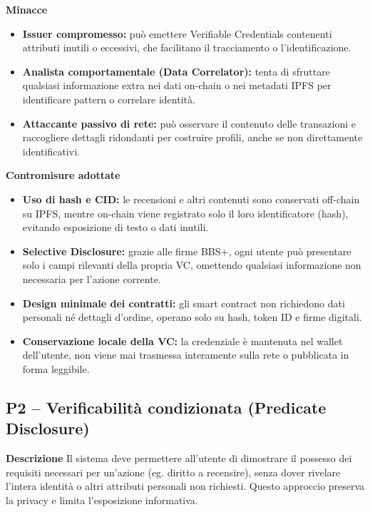             \noindent \textbf{Minacce}
                \begin{itemize}
                    \item \textbf{Issuer compromesso:} può emettere Verifiable Credentials contenenti attributi inutili o eccessivi, che facilitano il tracciamento o l'identificazione.

                    \item \textbf{Analista comportamentale (Data Correlator):} tenta di sfruttare qualsiasi informazione extra nei dati on-chain o nei metadati IPFS per identificare pattern o correlare identità.

                    \item \textbf{Attaccante passivo di rete:} può osservare il contenuto delle transazioni e raccogliere dettagli ridondanti per costruire profili, anche se non direttamente identificativi.
                \end{itemize}

            \noindent \textbf{Contromisure adottate}
                \begin{itemize}
                    \item \textbf{Uso di hash e CID:} le recensioni e altri contenuti sono conservati off-chain su IPFS, mentre on-chain viene registrato solo il loro identificatore (hash), evitando esposizione di testo o dati inutili.

                    \item \textbf{Selective Disclosure:} grazie alle firme BBS+, ogni utente può presentare solo i campi rilevanti della propria VC, omettendo qualsiasi informazione non necessaria per l'azione corrente.

                    \item \textbf{Design minimale dei contratti:} gli smart contract non richiedono dati personali né dettagli d'ordine, operano solo su hash, token ID e firme digitali.

                    \item \textbf{Conservazione locale della VC:} la credenziale è mantenuta nel wallet dell'utente, non viene mai trasmessa interamente sulla rete o pubblicata in forma leggibile.
                \end{itemize}


        \subsection{P2 – Verificabilità condizionata (Predicate Disclosure)}
            \noindent \textbf{Descrizione}
                Il sistema deve permettere all'utente di dimostrare il possesso dei requisiti necessari per un'azione (eg. diritto a recensire), senza dover rivelare l'intera identità o altri attributi personali non richiesti. Questo approccio preserva la privacy e limita l'esposizione informativa. \\

